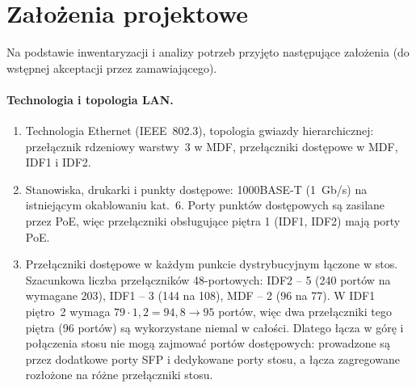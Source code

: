 \documentclass[12pt,a4paper]{article}
\begin{document}
\section{Założenia projektowe}

Na podstawie inwentaryzacji i analizy potrzeb przyjęto następujące założenia
(do wstępnej akceptacji przez zamawiającego).

\paragraph{Technologia i topologia LAN.}
\begin{enumerate}
  \item Technologia Ethernet (IEEE~802.3), topologia gwiazdy hierarchicznej:
  przełącznik rdzeniowy warstwy~3 w MDF, przełączniki dostępowe w MDF, IDF1
  i IDF2.
  \item Stanowiska, drukarki i punkty dostępowe: 1000BASE-T (1~Gb/s) na
  istniejącym okablowaniu kat.~6. Porty punktów dostępowych są zasilane
  przez PoE, więc przełączniki obsługujące piętra 1 (IDF1, IDF2) mają porty
  PoE.
  \item Przełączniki dostępowe w każdym punkcie dystrybucyjnym łączone
  w stos. Szacunkowa liczba przełączników 48-portowych: IDF2 -- 5 (240 portów
  na wymagane 203), IDF1 -- 3 (144 na 108), MDF -- 2 (96 na 77).
  W IDF1 piętro~2 wymaga $79 \cdot 1{,}2 = 94{,}8 \rightarrow 95$ portów,
  więc dwa przełączniki tego piętra (96 portów) są wykorzystane niemal
  w całości. Dlatego łącza w górę i połączenia stosu nie mogą zajmować portów
  dostępowych: prowadzone są przez dodatkowe porty SFP i dedykowane porty
  stosu, a łącza zagregowane rozłożone na różne przełączniki stosu.
\end{enumerate}
\end{document}
